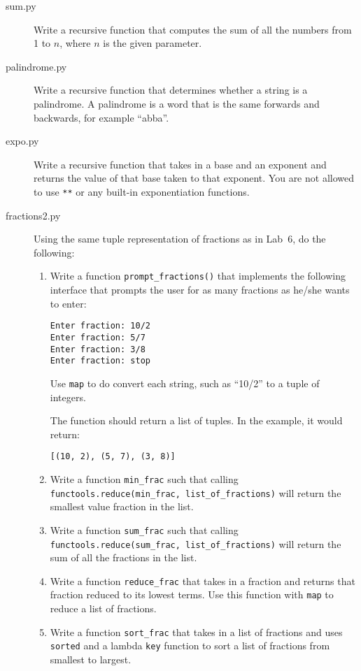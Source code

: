 \documentclass[11pt]{cselabheader}
\begin{document}
\begin{description}
  \item[sum.py] Write a recursive function that computes the sum of all the
    numbers from 1 to $n$, where $n$ is the given parameter.

  \item[palindrome.py] Write a recursive function that determines whether a
    string is a palindrome. A palindrome is a word that is the same forwards and
    backwards, for example ``abba''.

  \item[expo.py] Write a recursive function that takes in a base and an exponent
    and returns the value of that base taken to that exponent. You are not
    allowed to use \lstinline{**} or any built-in exponentiation functions.
  \item[fractions2.py] Using the same tuple representation of fractions as in
    Lab~6, do the following:

    \begin{enumerate}
      \item Write a function \lstinline!prompt_fractions()! that implements the
        following interface that prompts the user for as many fractions as
        he/she wants to enter:
        \begin{lstlisting}[style=bash]
Enter fraction: 10/2
Enter fraction: 5/7
Enter fraction: 3/8
Enter fraction: stop
        \end{lstlisting}

        Use \lstinline!map! to do convert each string, such as ``10/2'' to a
        tuple of integers.

        The function should return a list of tuples. In the example, it would
        return:
        \begin{lstlisting}
[(10, 2), (5, 7), (3, 8)]
        \end{lstlisting}

      \item Write a function \lstinline{min_frac} such that calling
        \lstinline{functools.reduce(min_frac, list_of_fractions)} will return
        the smallest value fraction in the list.
      \item Write a function \lstinline{sum_frac} such that calling
        \lstinline{functools.reduce(sum_frac, list_of_fractions)} will return
        the sum of all the fractions in the list.
      \item Write a function \lstinline{reduce_frac} that takes in a fraction
        and returns that fraction reduced to its lowest terms. Use this function
        with \lstinline{map} to reduce a list of fractions.
      \item Write a function \lstinline!sort_frac! that takes in a list of
        fractions and uses \lstinline{sorted}
        and a lambda \lstinline{key} function to sort a list of fractions from
        smallest to largest.
    \end{enumerate}


\end{description}
\end{document}
